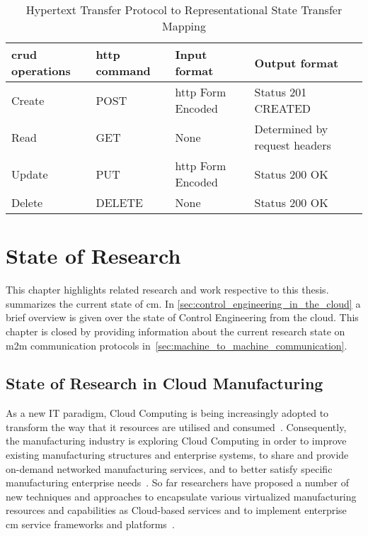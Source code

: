 \documentclass[
a4paper,
twoside,
headsepline,
cleardoublepage=empty,
parskip=half,
draft=false
]{scrbook}
\begin{document}
			\begin{table}[!h]
				\centering
				\caption{Hypertext Transfer Protocol to Representational State Transfer Mapping}
				\label{tab:http_rest_mapping}
				\begin{tabular}{@{}llll@{}}
					\toprule
					\gls{crud} operations & \gls{http} command & Input format & Output format
					\\ \midrule
					Create & POST & \gls{http} Form Encoded & Status 201 CREATED
					\\ \midrule
					Read & GET & None & Determined by request headers 
					\\ \midrule
					Update & PUT & \gls{http} Form Encoded & Status 200 OK
					\\ \midrule
					Delete & DELETE & None & Status 200 OK
					\\ \bottomrule
				\end{tabular}
			\end{table}

	\chapter{State of Research} \label{ch:state_of_the_Science}

		This chapter highlights related research and work respective to this thesis.  summarizes the current state of \gls{cm}. In \cref{sec:control_engineering_in_the_cloud} a brief overview is given over the state of Control Engineering from the cloud. This chapter is closed by providing information about the current research state on \gls{m2m} communication protocols in~\cref{sec:machine_to_machine_communication}.

		\section{State of Research in Cloud Manufacturing}\label{sec:state_of_science_cloud_manufacturing}

			As a new IT paradigm, Cloud Computing is being increasingly adopted to transform the way that \gls{it} resources are utilised and consumed~\cite{li2010cloud}. 
			Consequently, the manufacturing industry is exploring Cloud Computing in order to improve existing manufacturing structures and enterprise systems, to
			share and provide on-demand networked manufacturing services, and to better satisfy specific manufacturing enterprise needs~\cite{he2015state}.
			So far researchers have proposed a number of new techniques and approaches to encapsulate various virtualized manufacturing resources and capabilities as Cloud-based services and to implement enterprise \gls{cm} service frameworks and platforms~\cite{tao2011cloud}.
			
\end{document}

